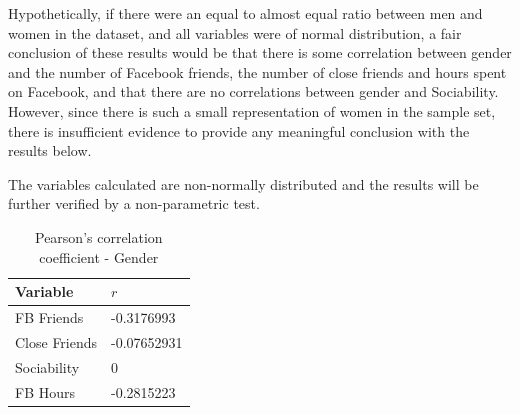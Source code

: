 Hypothetically, if there were an equal to almost equal ratio between men and women in the dataset, and all variables were of normal distribution, a fair conclusion of these results would be that there is some correlation between gender and the number of Facebook friends, the number of close friends and hours spent on Facebook, and that there are no correlations between gender and Sociability. However, since there is such a small representation of women in the sample set, there is insufficient evidence to provide any meaningful conclusion with the results below.

The variables calculated are non-normally distributed and the results will be further verified by a non-parametric test.

\begin{table}[H]
\centering
\caption{Pearson's correlation coefficient - Gender}
\begin{tabular}{l|l}
Variable      & $r$         \\ \hline
FB Friends    & -0.3176993  \\ \hline
Close Friends & -0.07652931 \\ \hline
Sociability   & 0           \\ \hline
FB Hours      & -0.2815223  \\ \hline
\end{tabular}
\end{table}

